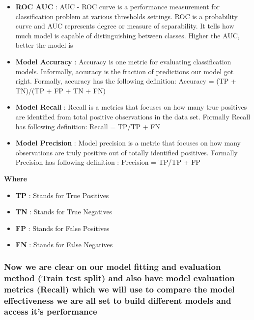 \documentclass[]{article}
\providecommand{\tightlist}{%
  \setlength{\itemsep}{0pt}\setlength{\parskip}{0pt}}
\begin{document}
\begin{itemize}
\item
  \textbf{ROC AUC} : AUC - ROC curve is a performance measurement for
  classification problem at various thresholds settings. ROC is a
  probability curve and AUC represents degree or measure of
  separability. It tells how much model is capable of distinguishing
  between classes. Higher the AUC, better the model is
\item
  \textbf{Model Accuracy} : Accuracy is one metric for evaluating
  classification models. Informally, accuracy is the fraction of
  predictions our model got right. Formally, accuracy has the following
  definition: Accuracy = (TP + TN)/(TP + FP + TN + FN)
\item
  \textbf{Model Recall} : Recall is a metrics that focuses on how many
  true positives are identified from total positive observations in the
  data set. Formally Recall has following definition: Recall = TP/TP +
  FN
\item
  \textbf{Model Precision} : Model precision is a metric that focuses on
  how many observations are truly positive out of totally identified
  positives. Formally Precision has following definition : Precision =
  TP/TP + FP
\end{itemize}

\textbf{Where}

\begin{itemize}
\tightlist
\item
  \textbf{TP} : Stands for True Positives
\item
  \textbf{TN} : Stands for True Negatives
\item
  \textbf{FP} : Stands for False Positives
\item
  \textbf{FN} : Stands for False Negatives
\end{itemize}

\hypertarget{now-we-are-clear-on-our-model-fitting-and-evaluation-method-train-test-split-and-also-have-model-evaluation-metrics-recall-which-we-will-use-to-compare-the-model-effectiveness-we-are-all-set-to-build-different-models-and-access-its-performance}{%
\subsubsection{\texorpdfstring{\textbf{Now we are clear on our model
fitting and evaluation method (Train test split) and also have model
evaluation metrics (Recall) which we will use to compare the model
effectiveness we are all set to build different models and access it's
performance}}{Now we are clear on our model fitting and evaluation method (Train test split) and also have model evaluation metrics (Recall) which we will use to compare the model effectiveness we are all set to build different models and access it's performance}}\label{now-we-are-clear-on-our-model-fitting-and-evaluation-method-train-test-split-and-also-have-model-evaluation-metrics-recall-which-we-will-use-to-compare-the-model-effectiveness-we-are-all-set-to-build-different-models-and-access-its-performance}}
\end{document}
